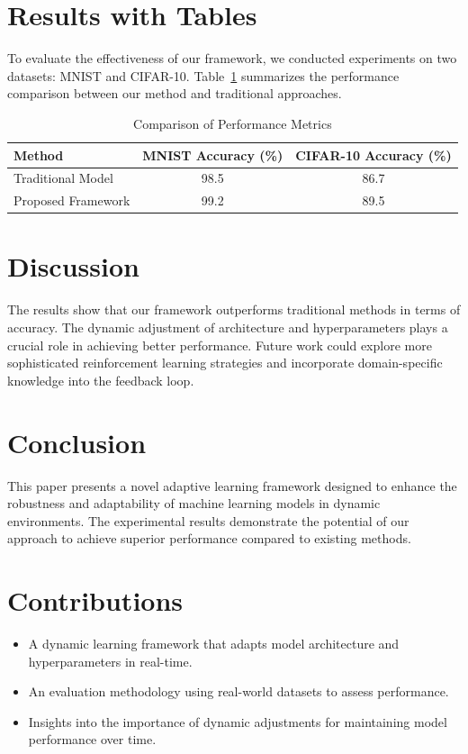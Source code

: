 \documentclass{article}
\begin{document}
\section{Results with Tables}
To evaluate the effectiveness of our framework, we conducted experiments on two datasets: MNIST and CIFAR-10. Table~\ref{tab:results} summarizes the performance comparison between our method and traditional approaches.

\begin{table}[ht]
\centering
\begin{tabular}{|l|c|c|}
\hline
Method & MNIST Accuracy (\%) & CIFAR-10 Accuracy (\%) \\
\hline
Traditional Model & 98.5 & 86.7 \\
Proposed Framework & 99.2 & 89.5 \\
\hline
\end{tabular}
\caption{Comparison of Performance Metrics}
\label{tab:results}
\end{table}

\section{Discussion}
The results show that our framework outperforms traditional methods in terms of accuracy. The dynamic adjustment of architecture and hyperparameters plays a crucial role in achieving better performance. Future work could explore more sophisticated reinforcement learning strategies and incorporate domain-specific knowledge into the feedback loop.

\section{Conclusion}
This paper presents a novel adaptive learning framework designed to enhance the robustness and adaptability of machine learning models in dynamic environments. The experimental results demonstrate the potential of our approach to achieve superior performance compared to existing methods.

\section{Contributions}
\begin{itemize}
    \item A dynamic learning framework that adapts model architecture and hyperparameters in real-time.
    \item An evaluation methodology using real-world datasets to assess performance.
    \item Insights into the importance of dynamic adjustments for maintaining model performance over time.
\end{itemize}



\end{document}
